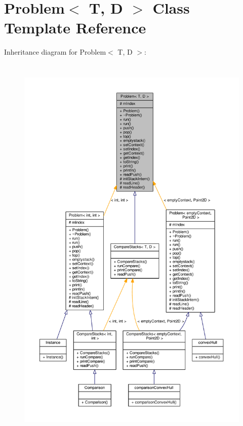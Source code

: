 \hypertarget{class_problem}{}\section{Problem$<$ T, D $>$ Class Template Reference}
\label{class_problem}


Inheritance diagram for Problem$<$ T, D $>$\+:
\nopagebreak
\begin{figure}[H]
\begin{center}
\leavevmode
\includegraphics[height=550pt]{class_problem__inherit__graph}
\end{center}
\end{figure}


